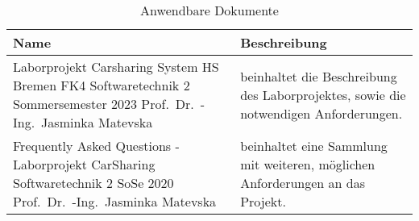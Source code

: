 \begin{table} [H]
    \centering
    \caption{Anwendbare Dokumente}
    \begin{tabularx}{\textwidth}{|X|X|}
        \toprule
        \textbf{Name} & \textbf{Beschreibung}\\
        \hline
        Laborprojekt Carsharing System HS Bremen FK4 Softwaretechnik 2 Sommersemester 2023 Prof.\ Dr.\ -Ing.\ Jasminka Matevska & beinhaltet die Beschreibung des Laborprojektes, sowie die notwendigen Anforderungen. \\
        \hline
        Frequently Asked Questions - Laborprojekt CarSharing Softwaretechnik 2 SoSe 2020 Prof.\ Dr.\ -Ing.\ Jasminka Matevska & beinhaltet eine Sammlung mit weiteren, möglichen Anforderungen an das Projekt. \\
        \bottomrule
    \end{tabularx}\label{tab:Anwendbare Dokumente}
\end{table}